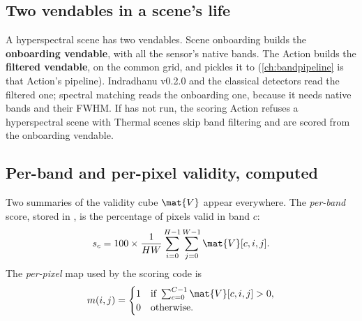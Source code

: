 \subsection{Two vendables in a scene's life}

A hyperspectral scene has two vendables. Scene onboarding builds the \textbf{onboarding vendable},
with all the sensor's native bands. The  Action builds the
\textbf{filtered vendable}, on the common grid, and pickles it to 
(\cref{ch:bandpipeline} is that Action's pipeline). Indradhanu v0.2.0 and the classical detectors
read the filtered one; spectral matching reads the onboarding one, because it needs native bands
and their FWHM. If  has not run, the scoring Action refuses a hyperspectral
scene with 
Thermal scenes skip band filtering and are scored from the onboarding vendable.


\subsection{Per-band and per-pixel validity, computed}

Two summaries of the validity cube $\mat{V}$ appear everywhere. The \emph{per-band} score, stored in
, is the percentage of pixels valid in band $c$:
\begin{equation}\label{eq:product:bandscore}
s_c = 100 \times \frac{1}{HW}\sum_{i=0}^{H-1}\sum_{j=0}^{W-1} \mat{V}[c,i,j].
\end{equation}
The \emph{per-pixel} map used by the scoring code is
\begin{equation}\label{eq:product:spatial}
m(i,j) = \begin{cases} 1 & \text{if } \sum_{c=0}^{C-1}\mat{V}[c,i,j] > 0,\\ 0 & \text{otherwise.}\end{cases}
\end{equation}


